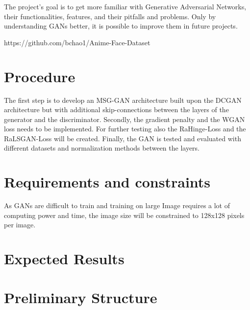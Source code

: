 \documentclass[conference,onecolumn,compsoc]{IEEEtran}
\begin{document}
\noindent
The project's goal is to get more familiar with Generative Adversarial Networks, their functionalities, features, and their pitfalls and problems. Only by understanding GANs better, it is possible to improve them in future projects.

https://github.com/bchao1/Anime-Face-Dataset


\section{Procedure}

\noindent
The first step is to develop an MSG-GAN \cite{karnewar2020msggan} architecture built upon the DCGAN \cite{radford2016unsupervised} architecture but with additional skip-connections between the layers of the generator and the discriminator. Secondly, the gradient penalty and the WGAN loss needs to be implemented. For further testing also the RaHinge-Loss and the RaLSGAN-Loss will be created. Finally, the GAN is tested and evaluated with different datasets and normalization methods between the layers.

\section{Requirements and constraints}

\noindent
As GANs are difficult to train and training on large Image requires a lot of computing power and time, the image size will be constrained to 128x128 pixels per image.

\section{Expected Results}

\noindent
\blindtext


\section{Preliminary  Structure}
\end{document}
